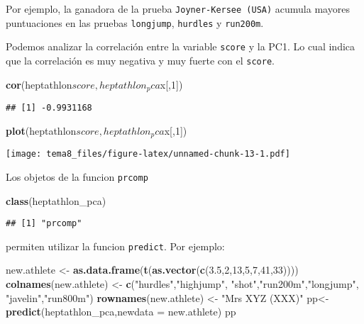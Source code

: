 \documentclass[]{article}
\newenvironment{Shaded}{\begin{snugshade}}{\end{snugshade}}
\newcommand{\KeywordTok}[1]{\textcolor[rgb]{0.13,0.29,0.53}{\textbf{{#1}}}}
\newcommand{\DataTypeTok}[1]{\textcolor[rgb]{0.13,0.29,0.53}{{#1}}}
\newcommand{\DecValTok}[1]{\textcolor[rgb]{0.00,0.00,0.81}{{#1}}}
\newcommand{\FloatTok}[1]{\textcolor[rgb]{0.00,0.00,0.81}{{#1}}}
\newcommand{\StringTok}[1]{\textcolor[rgb]{0.31,0.60,0.02}{{#1}}}
\newcommand{\NormalTok}[1]{{#1}}
\numberwithin{equation}{section}
\begin{document}
Por ejemplo, la ganadora de la prueba \texttt{Joyner-Kersee\ (USA)}
acumula mayores puntuaciones en las pruebas \texttt{longjump},
\texttt{hurdles} y \texttt{run200m}.

Podemos analizar la correlación entre la variable \texttt{score} y la
PC1. Lo cual indica que la correlación es muy negativa y muy fuerte con
el \texttt{score}.

\begin{Shaded}
\begin{Highlighting}[]
\KeywordTok{cor}\NormalTok{(heptathlon$score, heptathlon_pca$x[,}\DecValTok{1}\NormalTok{])}
\end{Highlighting}
\end{Shaded}

\begin{verbatim}
## [1] -0.9931168
\end{verbatim}

\begin{Shaded}
\begin{Highlighting}[]
\KeywordTok{plot}\NormalTok{(heptathlon$score, heptathlon_pca$x[,}\DecValTok{1}\NormalTok{])}
\end{Highlighting}
\end{Shaded}

\texttt{[image: tema8\_files/figure-latex/unnamed-chunk-13-1.pdf]}

Los objetos de la funcion \texttt{prcomp}

\begin{Shaded}
\begin{Highlighting}[]
\KeywordTok{class}\NormalTok{(heptathlon_pca)}
\end{Highlighting}
\end{Shaded}

\begin{verbatim}
## [1] "prcomp"
\end{verbatim}

permiten utilizar la funcion \texttt{predict}. Por ejemplo:

\begin{Shaded}
\begin{Highlighting}[]
\NormalTok{new.athlete <-}\StringTok{ }\KeywordTok{as.data.frame}\NormalTok{(}\KeywordTok{t}\NormalTok{(}\KeywordTok{as.vector}\NormalTok{(}\KeywordTok{c}\NormalTok{(}\FloatTok{3.5}\NormalTok{,}\DecValTok{2}\NormalTok{,}\DecValTok{13}\NormalTok{,}\DecValTok{5}\NormalTok{,}\DecValTok{7}\NormalTok{,}\DecValTok{41}\NormalTok{,}\DecValTok{33}\NormalTok{))))}
\KeywordTok{colnames}\NormalTok{(new.athlete) <-}\StringTok{ }\KeywordTok{c}\NormalTok{(}\StringTok{"hurdles"}\NormalTok{,}\StringTok{"highjump"}\NormalTok{,}
                           \StringTok{"shot"}\NormalTok{,}\StringTok{"run200m"}\NormalTok{,}\StringTok{"longjump"}\NormalTok{,}
                           \StringTok{"javelin"}\NormalTok{,}\StringTok{"run800m"}\NormalTok{)}
\KeywordTok{rownames}\NormalTok{(new.athlete) <-}\StringTok{ "Mrs XYZ (XXX)"}
\NormalTok{pp<-}\KeywordTok{predict}\NormalTok{(heptathlon_pca,}\DataTypeTok{newdata =} \NormalTok{new.athlete)}
\NormalTok{pp}
\end{Highlighting}
\end{Shaded}
\end{document}
